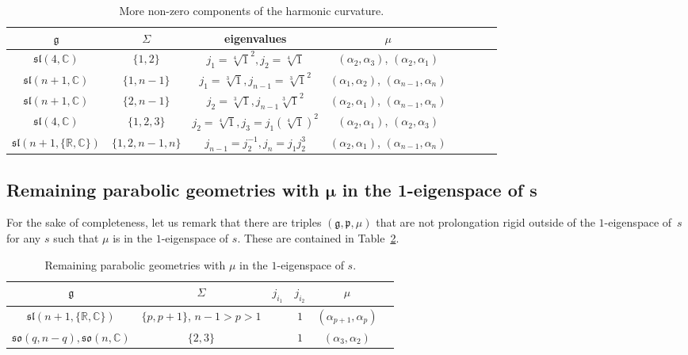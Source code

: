 \documentclass[10pt,a4paper]{amsart}
\newcommand{\fg}{\mathfrak g}
\newcommand{\fp}{\mathfrak p}
\newcommand{\C}{\mathbb{C}}
\numberwithin{equation}{section}
\begin{document}
\begin{table}[th!]\centering \caption{More non-zero components of the harmonic curvature.}\label{ahs14}\vspace{1mm}

\begin{tabular}{|c|c|c|c|c|c|c|c|}
\hline
$\fg$ & $\Sigma$ & eigenvalues & $\mu$ \\
\hline
\hline
$\mathfrak{sl}(4,\C)$ & $\{1,2\}$ & $j_1=\sqrt[4]{1}^{2}, j_2=\sqrt[4]{1}$ &$(\alpha_2,\alpha_3)$, $(\alpha_2,\alpha_1)$ \\
\hline
$\mathfrak{sl}(n+1,\mathbb{C})$ &$\{1,n-1\}$&$j_1=\sqrt[3]{1},j_{n-1}=\sqrt[3]{1}^2$& $(\alpha_1,\alpha_2)$, $(\alpha_{n-1},\alpha_n)$ \\
\hline
$\mathfrak{sl}(n+1,\mathbb{C})$ &$\{2,n-1\}$&$j_2=\sqrt[3]{1},j_{n-1}\sqrt[3]{1}^2$& $(\alpha_2,\alpha_1)$, $(\alpha_{n-1},\alpha_n)$ \\
\hline
$\mathfrak{sl}(4,\mathbb{C})$&$\{1,2,3\}$ & $j_2=\sqrt[4]{1},j_3=j_1(\sqrt[4]{1})^2$ &$(\alpha_2,\alpha_1)$, $(\alpha_2,\alpha_3)$ \\
\hline
$\mathfrak{sl}(n+1,\{\mathbb{R, C}\})$ & $\{1,2,n-1,n\}$&$j_{n-1}=j_2^{-1}, j_n=j_1j_2^3$&$(\alpha_2,\alpha_1)$, $(\alpha_{n-1},\alpha_n)$\\
\hline
\end{tabular}
\end{table}

\subsection[Remaining parabolic geometries with $\mu$ in the 1-eigenspace of $s$]{Remaining parabolic geometries with $\boldsymbol{\mu}$ in the 1-eigenspace of $\boldsymbol{s}$}

For the sake of completeness, let us remark that there are triples $(\fg,\fp,\mu)$ that are not prolongation rigid outside of the $1$-eigenspace of~$s$ for any $s$ such that $\mu$ is in the $1$-eigenspace of $s$. These are contained in Table~\ref{nhs}.

\begin{table}[th!]\centering \caption{Remaining parabolic geometries with $\mu$ in the $1$-eigenspace of $s$.}\label{nhs}\vspace{1mm}

\begin{tabular}{|c|c|c|c|c|c|}
\hline
$\fg$ & $\Sigma$ & $j_{i_1}$& $j_{i_2}$& $\mu$ \\
\hline
\hline
$\mathfrak{sl}(n+1,\{\mathbb{R, C}\})$ & $\{p,p+1\}$, $n-1>p>1$&&$1$&$(\alpha_{p+1},\alpha_p)$\\
\hline
$\mathfrak{so}(q,n-q), \mathfrak{so}(n,\mathbb{C})$ & $\{2,3\}$&&$1$&$(\alpha_{3},\alpha_2)$\\
\hline
\end{tabular}
\end{table}
\end{document}
